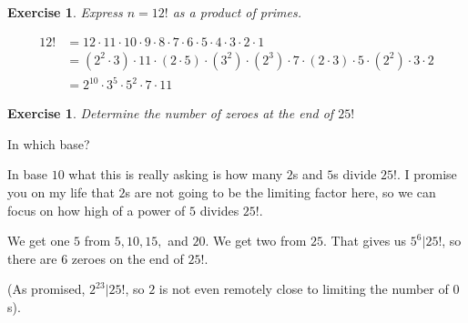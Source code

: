 \documentclass{article}
\newtheorem{ex}[thm]{Exercise}
\numberwithin{equation}{thm}
\begin{document}
\begin{ex} \label{2.10}
  Express $n = 12!$ as a product of primes.
\end{ex}

\begin{align*}
  12! &= 12 \cdot 11 \cdot 10 \cdot 9 \cdot 8 \cdot 7 \cdot 6 \cdot 5 \cdot 4 \cdot 3 \cdot 2 \cdot 1 \\
      &= (2^2 \cdot 3) \cdot 11 \cdot (2 \cdot 5) \cdot (3^2) \cdot (2^3) \cdot 7 \cdot (2 \cdot 3) \cdot 5 \cdot (2^2) \cdot 3 \cdot 2 \\
      &= 2^{10} \cdot 3^5 \cdot 5^2 \cdot 7 \cdot 11
\end{align*}



\begin{ex} \label{2.11}
  Determine the number of zeroes at the end of $25!$
\end{ex}

In which base?

In base $10$ what this is really asking is how many $2$s and $5$s divide $25!$. I promise you on my life that $2$s are not going to be the limiting factor here, so we can focus on how high of a power of $5$ divides $25!$.

We get one $5$ from $5, 10, 15,$ and $20$. We get two from $25$. That gives us $5^6 | 25!$, so there are $6$ zeroes on the end of $25!$.

(As promised, $2^{23} | 25!$, so $2$ is not even remotely close to limiting the number of $0$s).
\end{document}
